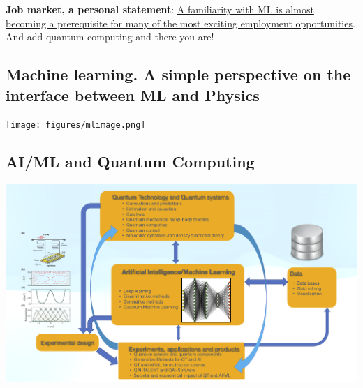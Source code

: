 \documentclass[%
oneside,                 %
final,                   %
10pt]{article}
\begin{document}
\textbf{Job market, a personal statement}: \href{{https://www.analyticsindiamag.com/top-countries-hiring-most-number-of-artificial-intelligence-machine-learning-experts/}}{A familiarity with ML is almost becoming a prerequisite for many of the most exciting employment opportunities}. And add quantum computing and there you are!

\subsection{Machine learning. A simple perspective on the interface between ML and Physics}

\vspace{6mm}

\centerline{\texttt{[image: figures/mlimage.png]}}

\vspace{6mm}

\subsection{AI/ML and Quantum Computing}

\vspace{6mm}

\centerline{\includegraphics[width=1.0\linewidth]{figures/QAIfig1.png}}

\vspace{6mm}

\end{document}
